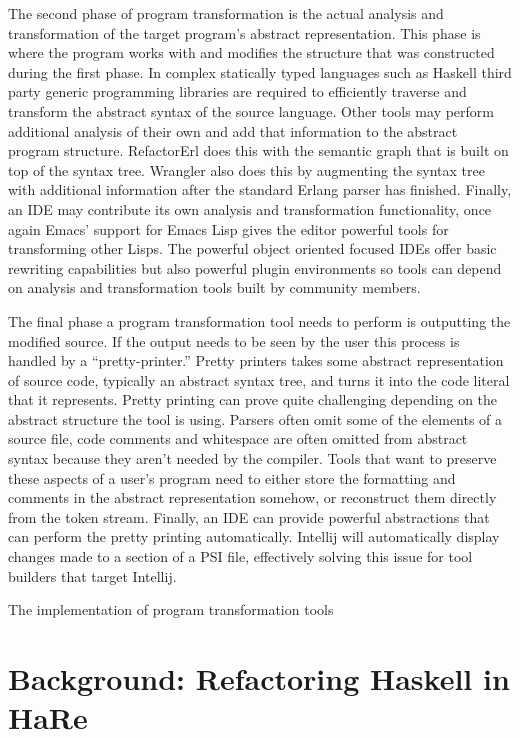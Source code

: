 The second phase of program transformation is the actual analysis and transformation of the target program's abstract representation. This phase is where the program works with and modifies the structure that was constructed during the first phase. In complex statically typed languages such as Haskell third party generic programming libraries are required to efficiently traverse and transform the abstract syntax of the source language. Other tools may perform additional analysis of their own and add that information to the abstract program structure. RefactorErl does this with the semantic graph  that is built on top of the syntax tree. Wrangler also does this by augmenting the syntax tree with additional information after the standard Erlang parser has finished. Finally, an IDE may contribute its own analysis and transformation functionality, once again Emacs' support for Emacs Lisp gives the editor powerful tools for transforming other Lisps. The powerful object oriented focused IDEs offer basic rewriting capabilities but also powerful plugin environments so tools can depend on analysis and transformation tools built by community members.

The final phase a program transformation tool needs to perform is outputting the modified source. If the output needs to be seen by the user this process is handled by a ``pretty-printer.'' Pretty printers takes some abstract representation of source code, typically an abstract syntax tree, and turns it into the code literal that it represents. Pretty printing can prove quite challenging depending on the abstract structure the tool is using. Parsers often omit some of the elements of a source file, code comments and whitespace are often omitted from abstract syntax because they aren't needed by the compiler. Tools that want to preserve these aspects of a user's program need to either store the formatting and comments in the abstract representation somehow, or reconstruct them directly from the token stream. Finally, an IDE can provide powerful abstractions that can perform the pretty printing automatically. Intellij will automatically display changes made to a section of a PSI file, effectively solving this issue for tool builders that target Intellij.

The implementation of program transformation tools  

\chapter{Background: Refactoring Haskell in HaRe}
\label{chp:hare}



